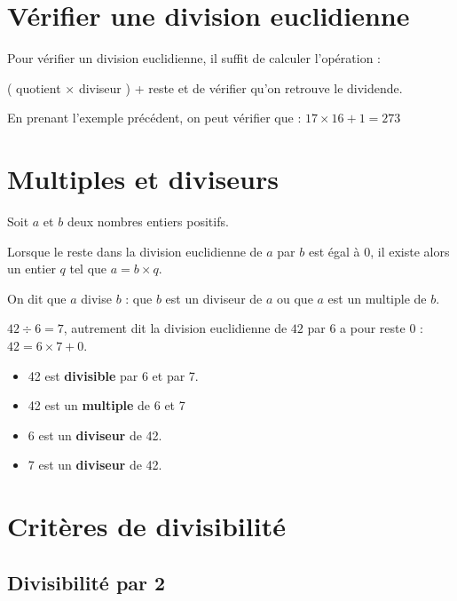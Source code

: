 \begin{pageCours}
\section{Vérifier une division euclidienne}

\begin{Mt}
Pour vérifier un division euclidienne, il suffit de calculer l'opération :

( quotient × diviseur ) + reste et de vérifier qu'on retrouve le dividende.

\begin{Ex}
En prenant l'exemple précédent, on peut vérifier que : $17\times16+1=273$
\end{Ex}
\end{Mt}

\section{Multiples et diviseurs}

\begin{Def}
Soit $a$ et $b$ deux nombres entiers positifs.

Lorsque le reste dans la division euclidienne de $a$ par $b$ est égal à $0$, il existe alors un entier $q$ tel que $a=b\times q$.

On dit que $a$ divise $b$ : que $b$ est un diviseur de $a$ ou que $a$ est un multiple de $b$.
\end{Def}

\begin{Ex}
\(42\div6=7\), autrement dit la division euclidienne de $42$ par $6$ a pour reste $0$ : \(42=6\times7+0\).\\

\begin{itemize}
    \item 42 est \textbf{divisible} par 6 et par 7.
    \item 42 est un \textbf{multiple} de 6 et 7
    \item 6 est un \textbf{diviseur} de 42.
    \item 7 est un \textbf{diviseur} de 42.
\end{itemize}
\end{Ex} 

\section{Critères de divisibilité}

\subsection{Divisibilité par 2}


\end{pageCours}
